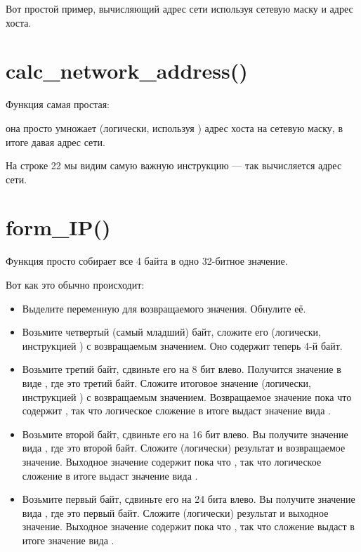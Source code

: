 Вот простой пример, вычисляющий адрес сети используя сетевую маску и адрес хоста.



\section{calc\_network\_address()}

Функция  самая простая: 

она просто умножает (логически, используя \AND) адрес хоста на сетевую маску, в итоге давая адрес
сети.



На строке 22 мы видим самую важную инструкцию \AND --- так вычисляется адрес сети.

\section{form\_IP()}

Функция  просто собирает все 4 байта в одно 32-битное значение.

Вот как это обычно происходит:

\begin{itemize}
\item Выделите переменную для возвращаемого значения. Обнулите её.

\item 
Возьмите четвертый (самый младший) байт, сложите его (логически, инструкцией \OR) с возвращаемым
значением. Оно содержит теперь 4-й байт.

\item Возьмите третий байт, сдвиньте его на 8 бит влево.
Получится значение в виде , где  это третий байт.
Сложите итоговое значение (логически, инструкцией \OR) с возвращаемым значением.
Возвращаемое значение пока что содержит , так что логическое сложение
в итоге выдаст значение вида .

\item 
Возьмите второй байт, сдвиньте его на 16 бит влево.
Вы получите значение вида , где  это второй байт.
Сложите (логически) результат и возвращаемое значение.
Выходное значение содержит пока что , так что логическое сложение
в итоге выдаст значение вида .

\item 
Возьмите первый байт, сдвиньте его на 24 бита влево.
Вы получите значение вида , где  это первый байт.
Сложите (логически) результат и выходное значение.
Выходное значение содержит пока что , так что сложение выдаст в итоге значение
вида .

\end{itemize}

